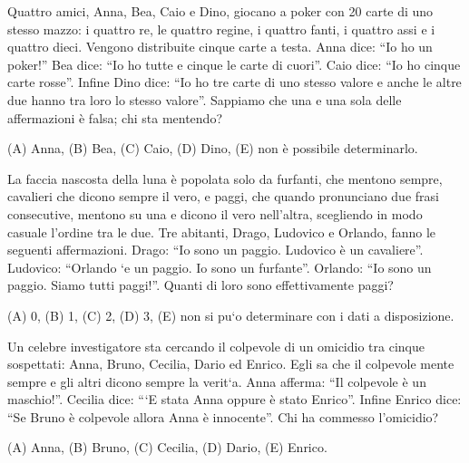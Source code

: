 \begin{esercizio}
    \label{ex:archimede_2009_biennio_20}
    Quattro amici, Anna, Bea, Caio e Dino, giocano a poker con 20 carte di uno stesso
    mazzo: i quattro re, le quattro regine, i quattro fanti, i quattro assi e i quattro dieci.
    Vengono distribuite cinque carte a testa.
    Anna dice: “Io ho un poker!”
    Bea dice: “Io ho tutte e cinque le carte di cuori”.
    Caio dice: “Io ho cinque carte rosse”.
    Infine Dino dice: “Io ho tre carte di uno stesso
    valore e anche le altre due hanno tra loro lo stesso valore”.
    Sappiamo che una e una sola delle affermazioni è falsa;
    chi sta mentendo?

    (A) Anna, \quad (B) Bea, \quad (C) Caio, \quad (D) Dino, \quad (E) non è possibile determinarlo.
\end{esercizio}

\begin{esercizio}
    \label{ex:archimede_2009_triennio_11}
    La faccia nascosta della luna è popolata solo da furfanti, che mentono sempre,
    cavalieri che dicono sempre il vero, e paggi, che quando pronunciano due frasi consecutive,
    mentono su una e dicono il vero nell’altra, scegliendo in modo casuale
    l’ordine tra le due.
    Tre abitanti, Drago, Ludovico e Orlando, fanno le seguenti
    affermazioni.
    Drago: “Io sono un paggio.
    Ludovico è un cavaliere”.
    Ludovico: “Orlando `e un paggio.
    Io sono un furfante”.
    Orlando: “Io sono un paggio.
    Siamo tutti paggi!”.
    Quanti di loro sono effettivamente paggi?

    (A) 0, \quad (B) 1, \quad (C) 2, \quad (D) 3, \quad (E) non si pu`{o} determinare con i dati a
    disposizione.
\end{esercizio}

\begin{esercizio}
    \label{ex:archimede_2010_biennio_18}
    Un celebre investigatore sta cercando il colpevole di un omicidio tra cinque sospettati: Anna, Bruno, Cecilia,
    Dario ed Enrico.
    Egli sa che il colpevole mente sempre e gli altri dicono sempre la verit`{a}.
    Anna afferma: “Il colpevole è un maschio!”.
    Cecilia dice: “`E stata Anna oppure è stato Enrico”.
    Infine Enrico dice: “Se Bruno è colpevole allora Anna è innocente”.
    Chi ha commesso l’omicidio?

    (A) Anna, \quad (B) Bruno, \quad (C) Cecilia, \quad (D) Dario, \quad (E) Enrico.
\end{esercizio}

